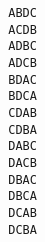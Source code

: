 \begin{multicols}{2}
	\begin{verbatim}
		ABDC
		ACDB
		ADBC
		ADCB
		BDAC
		BDCA
		CDAB
		CDBA
		DABC
		DACB
		DBAC
		DBCA
		DCAB
		DCBA
	\end{verbatim}
\end{multicols}